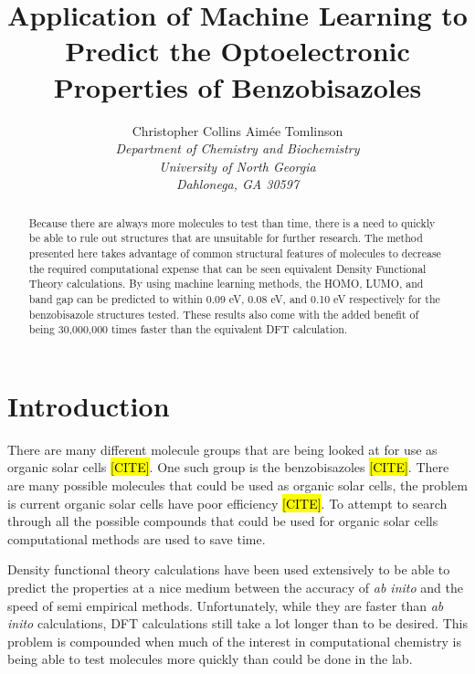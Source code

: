 \documentclass[10pt]{article}
\begin{document}
\title{Application of Machine Learning to Predict the Optoelectronic Properties of Benzobisazoles}
\author{Christopher Collins \qquad Aim\'{e}e Tomlinson\\
        \emph{Department of Chemistry and Biochemistry}\\
        \emph{University of North Georgia}\\
        \emph{Dahlonega, GA 30597}}

\maketitle

\begin{abstract}
Because there are always more molecules to test than time, there is a need to quickly be able to rule out structures that are unsuitable for further research. The method presented here takes advantage of common structural features of molecules to decrease the required computational expense that can be seen equivalent Density Functional Theory calculations. By using machine learning methods, the HOMO, LUMO, and band gap can be predicted to within 0.09 eV, 0.08 eV, and 0.10 eV respectively for the benzobisazole structures tested. These results also come with the added benefit of being 30,000,000 times faster than the equivalent DFT calculation.
\end{abstract}

\section{Introduction}

There are many different molecule groups that are being looked at for use as organic solar cells \hl{[CITE]}. One such group is the benzobisazoles \hl{[CITE]}. There are many possible molecules that could be used as organic solar cells, the problem is current organic solar cells have poor efficiency \hl{[CITE]}. To attempt to search through all the possible compounds that could be used for organic solar cells computational methods are used to save time.

Density functional theory calculations have been used extensively to be able to predict the properties at a nice medium between the accuracy of \emph{ab inito} and the speed of semi empirical methods. Unfortunately, while they are faster than \emph{ab inito} calculations, DFT calculations still take a lot longer than to be desired. This problem is compounded when much of the interest in computational chemistry is being able to test molecules more quickly than could be done in the lab.
\end{document}
